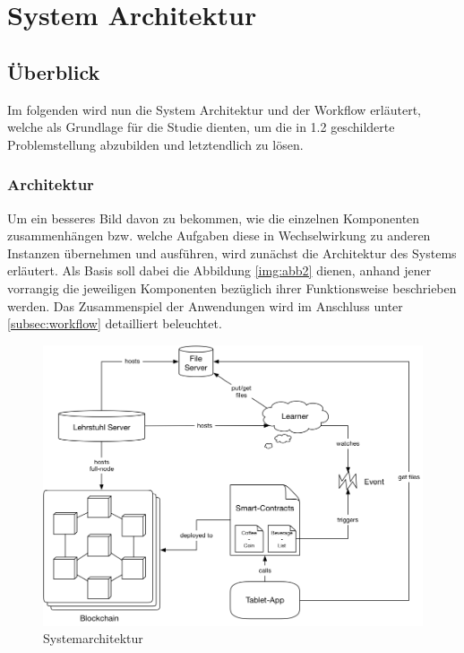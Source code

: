 \chapter{System Architektur}
\label{kap:Kapitel03}

\section{Überblick}
Im folgenden wird nun die System Architektur und der Workflow erläutert, welche als Grundlage für die Studie dienten, um die in 1.2 geschilderte Problemstellung abzubilden und letztendlich zu lösen.

\subsection{Architektur}
\label{subsec:architecture}
Um ein besseres Bild davon zu bekommen, wie die einzelnen Komponenten
zusammenhängen bzw. welche Aufgaben diese in Wechselwirkung zu anderen Instanzen übernehmen und ausführen, wird zunächst die Architektur des Systems erläutert. Als Basis soll dabei die Abbildung \ref{img:abb2} dienen, anhand jener vorrangig die jeweiligen Komponenten bezüglich ihrer Funktionsweise beschrieben werden. Das Zusammenspiel der Anwendungen wird im Anschluss unter \ref{subsec:workflow} detailliert beleuchtet.

\clearpage
\newpage

\begin{figure}[th!]
	\centering
	\includegraphics[width=.99\columnwidth]{./Abbildungen/Kapitel_03/system_architecture.png}
	\caption{Systemarchitektur}
	\label{img:abb1}
\end{figure}
\FloatBarrier

